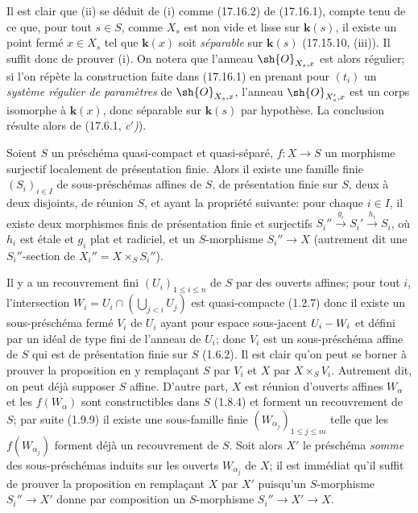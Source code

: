 Il est clair que (ii) se déduit de (i) comme (17.16.2) de (17.16.1), compte tenu de ce que, pour tout $s\in S$, comme $X_s$ est non vide et lisse sur $\boldsymbol{k}(s)$, il existe un point fermé $x\in X_s$ tel que $\boldsymbol{k}(x)$ soit \emph{séparable} sur $\boldsymbol{k}(s)$ (17.15.10, (iii)). Il suffit donc de prouver (i). On notera que l'anneau $\sh{O}_{X_s,x}$ est alors régulier; si l'on répète la construction faite dans (17.16.1) en prenant pour $(t_i)$ un \emph{système régulier de paramètres} de $\sh{O}_{X_s,x}$, l'anneau $\sh{O}_{X'_s,x}$ est un corps isomorphe à $\boldsymbol{k}(x)$, donc séparable sur $\boldsymbol{k}(s)$ par hypothèse. La conclusion résulte alors de (17.6.1, \emph{c$'$)}).

\begin{proposition}[17.16.4]
\label{IV.17.16.4}
Soient $S$ un préschéma quasi-compact et quasi-séparé, $f:X\to S$ un morphisme surjectif localement de présentation finie. Alors il existe une famille finie $(S_i)_{i\in I}$
de sous-préschémas affines de $S$, de présentation finie sur $S$, deux à deux disjoints, de réunion $S$, et ayant la propriété suivante: pour chaque $i\in I$, il existe deux morphismes finis de présentation finie et surjectifs $S_i''\xrightarrow{g_i}S_i'\xrightarrow{h_i}S_i$, où $h_i$ est étale et $g_i$ plat et radiciel, et un $S$-morphisme $S_i''\to X$ \textup{(autrement dit une} $S_i''$-section \textup{de} $X_i''=X\times_S S_i''$\textup{)}.
\end{proposition}

Il y a un recouvrement fini $(U_i)_{1\leq i\leq n}$ de $S$ par des ouverts affines; pour tout $i$, l'intersection $W_i=U_i\cap\left(\bigcup_{j<i}U_j\right)$ est quasi-compacte (1.2.7) donc il existe un sous-préschéma fermé $V_i$ de $U_i$ ayant pour espace sous-jacent $U_i- W_i$ et défini par un idéal de type fini de l'anneau de $U_i$; donc $V_i$ est un sous-préschéma affine de $S$ qui est de présentation finie sur $S$ (1.6.2). Il est clair qu'on peut se borner à prouver la proposition en y remplaçant $S$ par $V_i$ et $X$ par $X\times_S V_i$. Autrement dit, on peut déjà supposer $S$ affine. D'autre part, $X$ est réunion d'ouverts affines $W_\alpha$ et les $f(W_\alpha)$ sont constructibles dans $S$ (1.8.4) et forment un recouvrement de $S$; par suite (1.9.9) il existe une sous-famille finie $(W_{\alpha_j})_{1\leq j\leq m}$ telle que les $f(W_{\alpha_j})$ forment déjà un recouvrement de $S$. Soit alors $X'$ le préschéma \emph{somme} des sous-préschémas induits sur les ouverts $W_{\alpha_j}$ de $X$; il est immédiat qu'il suffit de prouver la proposition en remplaçant $X$ par $X'$ puisqu'un $S$-morphisme $S_i''\to X'$ donne par composition un $S$-morphisme $S_i''\to X'\to X$.

